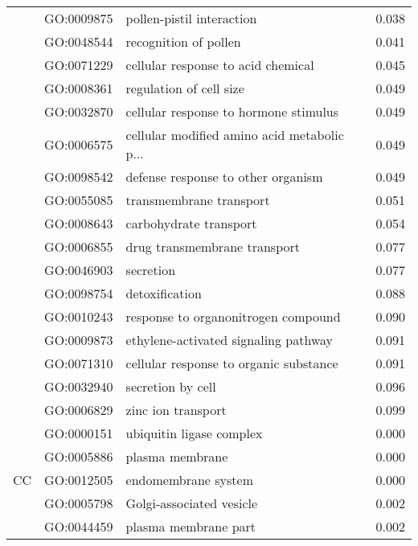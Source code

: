 \begin{longtable}{lllr}
   & GO:0009875 &                    pollen-pistil interaction &         0.038 \\
   & GO:0048544 &                        recognition of pollen &         0.041 \\
   & GO:0071229 &           cellular response to acid chemical &         0.045 \\
   & GO:0008361 &                      regulation of cell size &         0.049 \\
   & GO:0032870 &        cellular response to hormone stimulus &         0.049 \\
   & GO:0006575 &  cellular modified amino acid metabolic p... &         0.049 \\
   & GO:0098542 &           defense response to other organism &         0.049 \\
   & GO:0055085 &                      transmembrane transport &         0.051 \\
   & GO:0008643 &                       carbohydrate transport &         0.054 \\
   & GO:0006855 &                 drug transmembrane transport &         0.077 \\
   & GO:0046903 &                                    secretion &         0.077 \\
   & GO:0098754 &                               detoxification &         0.088 \\
   & GO:0010243 &          response to organonitrogen compound &         0.090 \\
   & GO:0009873 &         ethylene-activated signaling pathway &         0.091 \\
   & GO:0071310 &       cellular response to organic substance &         0.091 \\
   & GO:0032940 &                            secretion by cell &         0.096 \\
   & GO:0006829 &                           zinc ion transport &         0.099 \\
\cline{1-4}
\multirow{28}{*}{CC} & GO:0000151 &                     ubiquitin ligase complex &         0.000 \\
   & GO:0005886 &                              plasma membrane &         0.000 \\
   & GO:0012505 &                          endomembrane system &         0.000 \\
   & GO:0005798 &                     Golgi-associated vesicle &         0.002 \\
   & GO:0044459 &                         plasma membrane part &         0.002 \\

\end{longtable}
